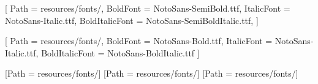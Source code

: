 \iffonts
  \RequirePackage{anyfontsize}
  \RequirePackage[no-math]{fontspec}
	\setmainfont{NotoSans-Regular.ttf}[
		Path = resources/fonts/,
		BoldFont = {NotoSans-SemiBold.ttf},
		ItalicFont = {NotoSans-Italic.ttf},
		BoldItalicFont = {NotoSans-SemiBoldItalic.ttf},
	]
	
    [
        Path = resources/fonts/,
        BoldFont = {NotoSans-Bold.ttf},
        ItalicFont = {NotoSans-Italic.ttf},
        BoldItalicFont = {NotoSans-BoldItalic.ttf}
    ]
    
	[Path = resources/fonts/]
	[Path = resources/fonts/]
	[Path = resources/fonts/]
\else
  \renewcommand\normalfont{\sffamily}
  \renewcommand{\familydefault}{\sfdefault}
  \def\titlefont{\sffamily\bfseries}
  \def\subtitlefont{\sffamily\bfseries}
  \def\titlenumfont{\sffamily\bfseries}
  \def\taskfont{\sffamily}
\fi

\renewcommand{\small}{\fontsize{10}{12}\selectfont}
\renewcommand{\normalsize}{\fontsize{11}{13.2}\selectfont}
\renewcommand{\large}{\fontsize{12}{14.4}\selectfont}
\renewcommand{\Large}{\fontsize{14}{16.8}\selectfont}
\renewcommand{\LARGE}{\fontsize{16}{19.2}\selectfont}
\renewcommand{\huge}{\fontsize{22}{26.4}\selectfont}
\renewcommand{\Huge}{\fontsize{28}{33.6}\selectfont}
\renewcommand{\HUGE}{\fontsize{40}{48}\selectfont}
\newcommand{\semihuge}{\fontsize{18}{21.6}\selectfont}
\newcommand{\semiHuge}{\fontsize{26}{31.2}\selectfont}
\newcommand{\EXHUGE}{\fontsize{108}{129.6}\selectfont}

\newcommand{\volumenumfont}{%
	\EXHUGE\fontsize{108}{129.6}\selectfont
}

\newcommand{\volumetitlefont}{%
	\linespread{.8}\HUGE\color{white}\titlefont
}

\newcommand{\volumeauthorfont}{%
	\huge\subtitlefont\color{white}
}

\newcommand{\chaptertitlefont}{%
	\huge\color{white}\titlefont
}

\newcommand{\chapternamefont}{%
	\semihuge\color{white}\subtitlefont
}

\newcommand{\chapterauthorfont}{%
	\LARGE\color{white}\subtitlefont
}

\newcommand{\sectiontitlefont}{%
  \huge\ifteacherpage%
    \color{\currentvolcolor}%
  \else%
    \color{principal}
  \fi\titlefont\scshape
}

\newcommand{\subsectiontitlefont}{%
  \Large\color{\currentcolor}\subtitlefont%
}

\newcommand{\bannernamefont}{%
	\normalfont\large\bfseries\color{white}
}

\newcommand{\bannertitlefont}{%
   	\normalfont\normalsize\color\currentcolor\titlefont
}

\newcommand{\boxnamefont}{%
	\normalfont\large\bfseries\color{white}
}

\newcommand{\boxtitlefont}{%
  \normalfont\large\bfseries\color{\currentcolor}
}

\newcommand{\footerfont}{%
	\titlefont\large\color{white}	
}

\setlength{\parindent}{0em}
\setlength{\parskip}{1em plus 2pt minus 1pt}
